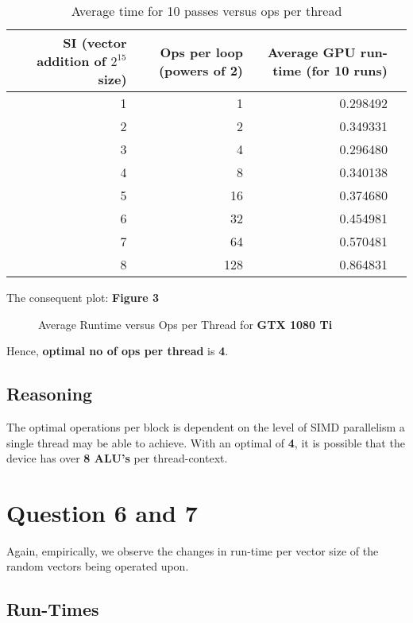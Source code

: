 \begin{table}[ht]
\footnotesize
\centering
\begin{tabular}{r||rrr}
 SI (vector addition of $2^{15}$ size) & Ops per loop (powers of 2) & Average GPU run-time (for 10 runs)  \\ 
 \hline \hline
1 & 1 &  0.298492 \\ 
2& 2  & 0.349331 \\
3& 4 & 0.296480 \\
4& 8 & 0.340138 \\
5& 16 & 0.374680 \\
6 & 32 &0.454981 \\
7 & 64 &0.570481 \\
8 & 128 &0.864831 \\
\end{tabular}
\caption{Average time for 10 passes versus ops per thread}
\end{table}

The consequent plot: \textbf{Figure 3} \\

\begin{figure}[ht]
\centering
\caption{Average Runtime versus Ops per Thread for \textbf{GTX 1080 Ti}}
\end{figure}

Hence, \textbf{optimal no of ops per thread} is \textbf{4}.\\

\subsection{Reasoning}

The optimal operations per block is dependent on the level of SIMD parallelism a single thread may be able to achieve. With an optimal of \textbf{4}, it is possible that the device has over \textbf{8 ALU's} per thread-context. \\

\section {Question 6 and 7}
Again, empirically, we observe the changes in run-time per vector size of the random vectors being operated upon.
 
 \subsection{Run-Times}
 
